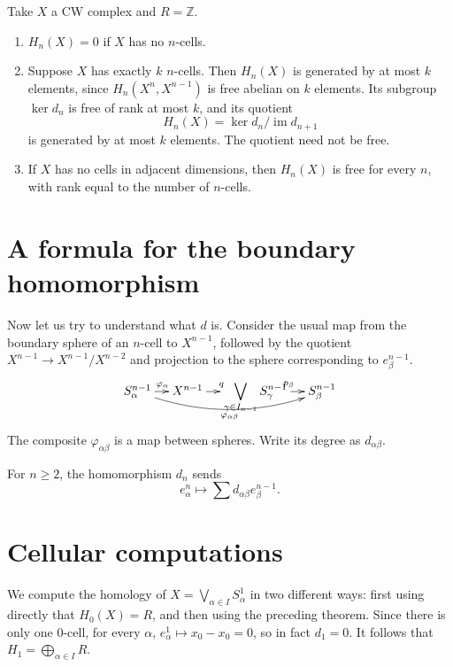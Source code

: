 \begin{proposition}
Take $X$ a CW complex and $R=\mathbb{Z}$.
\begin{enumerate}
\item $H_n(X)=0$ if $X$ has no $n$-cells.
\item Suppose $X$ has exactly $k$ $n$-cells.
Then $H_n(X)$ is
generated by at most $k$ elements, since
$H_n(X^n,X^{n-1})$ is free abelian on
$k$ elements. Its subgroup $\ker d_n$ is
free of rank at most $k$, and its quotient
$$
H_n(X)=\ker d_n/
\operatorname{im}d_{n+1}
$$
is generated by at most $k$ elements. The
quotient need not be free.
\item If $X$ has no cells in adjacent
dimensions, then
$H_n(X)$ is free for every $n$, with rank
equal to the number
of $n$-cells.
\end{enumerate}
\end{proposition}
\section{A formula for the boundary
homomorphism}
\label{section-cellular-boundary-formula}

Now let us try to understand what $d$ is.
Consider the usual
map from the boundary sphere of an $n$-cell
to
$X^{n-1}$, followed by the quotient
$X^{n-1}\to X^{n-1}/X^{n-2}$ and
projection to the sphere corresponding to
$e^{n-1}_\beta$.
$$
\xymatrix@C=1.1em{
S^{n-1}_\alpha
  \ar[r]^{\varphi_\alpha}
  \ar@/_1.2pc/[rrr]_{\varphi_{\alpha\beta}}
 & X^{n-1} \ar[r]^q
 & \displaystyle
   \bigvee_{\gamma\in I_{n-1}}
   S^{n-1}_\gamma
   \ar[r]^{p_\beta}
 & S^{n-1}_\beta
}
$$
The composite $\varphi_{\alpha\beta}$ is a
map between spheres. Write its degree as
$d_{\alpha\beta}$.

\begin{theorem}
For $n\geq2$, the homomorphism $d_n$ sends
$$
e^n_\alpha\mapsto\sum
d_{\alpha\beta}e^{n-1}_\beta.
$$
\end{theorem}
\section{Cellular computations}
\label{section-cellular-computations}

\begin{example}
We compute the homology of
$X=\bigvee_{\alpha\in I}S^1_\alpha$ in two
different ways:
first using directly that $H_0(X)=R$, and
then using the
preceding theorem. Since there is only one
0-cell, for every
$\alpha$, $e^1_\alpha\mapsto x_0-x_0=0$, so
in fact
$d_1=0$. It follows that
$H_1=\bigoplus_{\alpha\in I}R$.
\end{example}


